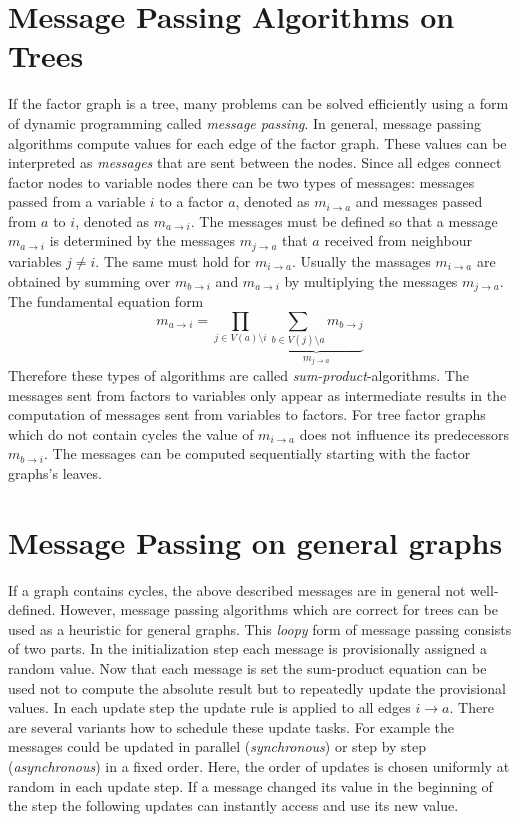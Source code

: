 \section{Message Passing Algorithms on Trees}

If the factor graph is a tree, many problems can be solved efficiently using a form of dynamic programming called \emph{message passing}. \newline 
In general, message passing algorithms compute values for each edge of the factor graph. These values can be interpreted as \emph{messages} that are sent between the nodes. Since all edges connect factor nodes to variable nodes there can be two types of messages: messages passed from a variable $i$ to a factor $a$, denoted as $m_{i \rightarrow a}$ and messages passed from $a$ to $i$, denoted as $m_{a \rightarrow i}$. \newline
The messages must be defined so that a message $m_{a \rightarrow i}$ is determined by the messages $m_{j \rightarrow a}$ that $a$ received from neighbour variables $j \neq i$. 
The same must hold for $m_{i \rightarrow a}$. \newline
Usually the massages $m_{i \rightarrow a}$ are obtained by summing over $m_{b \rightarrow i}$ and $m_{a \rightarrow i}$ by multiplying the messages $m_{j \rightarrow a}$. The fundamental equation form $$m_{a \rightarrow i} = \prod_{j \in V(a) \setminus i} \underbrace{\sum_{b \in V(j) \setminus a} m_{b \rightarrow j}}_{m_{j \rightarrow a}}$$ Therefore these types of algorithms are called \emph{sum-product}-algorithms. The messages sent from factors to variables only appear as intermediate results in the computation of messages sent from variables to factors. \newline
For tree factor graphs which do not contain cycles the value of $m_{i \rightarrow a}$ does not influence its predecessors $m_{b \rightarrow i}$. The messages can be computed sequentially starting with the factor graphs's leaves.


\section{Message Passing on general graphs}
If a graph contains cycles, the above described messages are in general not well-defined. However, message passing algorithms which are correct for trees can be used as a heuristic for general graphs. \newline
This \emph{loopy} form of message passing consists of two parts. In the initialization  step each message is provisionally assigned a random value. Now that each message is set the sum-product equation can be used not to compute the absolute result but to repeatedly update the provisional values. In each update step the update rule is applied to all edges $i \rightarrow a$. There are several variants how to schedule these update tasks. For example the messages could be updated in parallel (\emph{synchronous}) or step by step (\emph{asynchronous}) in a fixed order. Here, the order of updates is chosen uniformly at random in each update step. If a message changed its value in the beginning of the step the following updates can instantly access and use its new value. 

